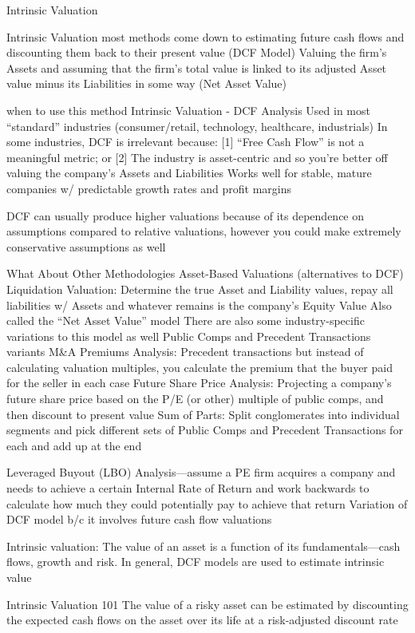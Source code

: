 \documentclass[10pt]{article}
\begin{document}
    \begin{core}{Intrinsic Valuation}

      Intrinsic Valuation
        most methods come down to estimating future cash flows and discounting them back to their present value (DCF Model)
        Valuing the firm’s Assets and assuming that the firm’s total value is linked to its adjusted Asset value minus its Liabilities in some way (Net Asset Value)

      when to use this method
      Intrinsic Valuation - DCF Analysis
        Used in most “standard” industries (consumer/retail, technology, healthcare, industrials)
        In some industries, DCF is irrelevant because: [1] “Free Cash Flow” is not a meaningful metric; or [2] The industry is asset-centric and so you’re better off valuing the company’s Assets and Liabilities
        Works well for stable, mature companies w/ predictable growth rates and profit margins

      DCF can usually produce higher valuations because of its dependence on assumptions compared to relative valuations, however you could make extremely conservative assumptions as well

      What About Other Methodologies
        Asset-Based Valuations (alternatives to DCF)
        Liquidation Valuation: Determine the true Asset and Liability values, repay all liabilities w/ Assets and whatever remains is the company’s Equity Value
        Also called the “Net Asset Value” model
        There are also some industry-specific variations to this model as well
        Public Comps and Precedent Transactions variants
        M&A Premiums Analysis: Precedent transactions but instead of calculating valuation multiples, you calculate the premium that the buyer paid for the seller in each case
        Future Share Price Analysis: Projecting a company’s future share price based on the P/E (or other) multiple of public comps, and then discount to present value
        Sum of Parts: Split conglomerates into individual segments and pick different sets of Public Comps and Precedent Transactions for each and add up at the end

      Leveraged Buyout (LBO) Analysis—assume a PE firm acquires a company and needs to achieve a certain Internal Rate of Return and work backwards to calculate how much they could potentially pay to achieve that return
      Variation of DCF model b/c it involves future cash flow valuations

      Intrinsic valuation: The value of an asset is a function of its fundamentals—cash flows, growth and risk. In general, DCF models are used to estimate intrinsic value

      Intrinsic Valuation 101
      The value of a risky asset can be estimated by discounting the expected cash flows on the asset over its life at a risk-adjusted discount rate

    \end{core}
\end{document}
